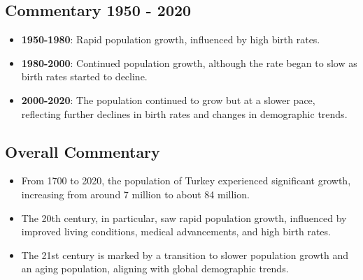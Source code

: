 \subsection*{Commentary 1950 - 2020}
\begin{itemize}
    \item \textbf{1950-1980}: Rapid population growth, influenced by high birth rates.
    \item \textbf{1980-2000}: Continued population growth, although the rate began to slow as birth rates started to decline.
    \item \textbf{2000-2020}: The population continued to grow but at a slower pace, reflecting further declines in birth rates and changes in demographic trends.
\end{itemize}

\subsection*{Overall Commentary}
\begin{itemize}
    \item From 1700 to 2020, the population of Turkey experienced significant growth, increasing from around 7 million to about 84 million.
    \item The 20th century, in particular, saw rapid population growth, influenced by improved living conditions, medical advancements, and high birth rates.
    \item The 21st century is marked by a transition to slower population growth and an aging population, aligning with global demographic trends.
\end{itemize}
